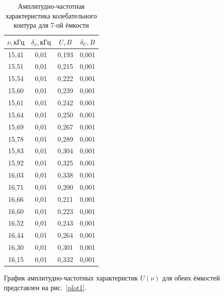 \documentclass[a4paper, 12pt]{article}
\begin{document}
\begin{table}[h!]
\begin{center}
\begin{tabular}{|c|c|c|c|}
\hline
$\nu, кГц$ & $\delta_{\nu}, кГц$ & $U, B$  & $\delta_U, B$ \\ \hline
15,41  & 0,01    & 0,193 & 0,001 \\ \hline
15,51  & 0,01    & 0,215 & 0,001 \\ \hline
15,54  & 0,01    & 0,222 & 0,001 \\ \hline
15,60  & 0,01    & 0,239 & 0,001 \\ \hline
15,61  & 0,01    & 0,242 & 0,001 \\ \hline
15,64  & 0,01    & 0,250 & 0,001 \\ \hline
15,69  & 0,01    & 0,267 & 0,001 \\ \hline
15,78  & 0,01    & 0,289 & 0,001 \\ \hline
15,83  & 0,01    & 0,304 & 0,001 \\ \hline
15,92  & 0,01    & 0,325 & 0,001 \\ \hline
16,03  & 0,01    & 0,338 & 0,001 \\ \hline
16,71  & 0,01    & 0,200 & 0,001 \\ \hline
16,66  & 0,01    & 0,211 & 0,001 \\ \hline
16,60  & 0,01    & 0,223 & 0,001 \\ \hline
16,52  & 0,01    & 0,243 & 0,001 \\ \hline
16,44  & 0,01    & 0,264 & 0,001 \\ \hline
16,30  & 0,01    & 0,301 & 0,001 \\ \hline
16,15  & 0,01    & 0,332 & 0,001 \\ \hline
\end{tabular}
\end{center}
\caption{Амплитудно-частотная характеристика колебательного контура для 7-ой ёмкости}
\label{tab3}
\end{table}

График амплитудно-частотных характеристик $U(\nu)$ для обеих ёмкостей представлен на рис.~\ref{plot1}.
\end{document}
